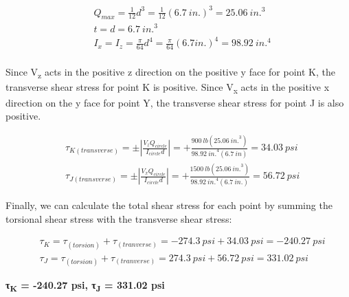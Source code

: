 \documentclass[
  letterpaper,
  DIV=11,
  numbers=noendperiod]{scrreprt}
\theoremstyle{definition}
\theoremstyle{remark}
\begin{document}
\begin{tcolorbox}
\begin{tcolorbox}
\[
\begin{aligned}
& Q_{max}=\frac{1}{12} d^3=\frac{1}{12}(6.7{~in.})^3=25.06{~in.^3} \\
& t=d=6.7{~in.}^3 \\
& I_x=I_z=\frac{\pi}{64} d^4=\frac{\pi}{64}(6.7{in.})^4=98.92{~in.^4} \\
&
\end{aligned}
\]

Since V\textsubscript{z} acts in the positive z direction on the
positive y face for point K, the transverse shear stress for point K is
positive. Since V\textsubscript{x} acts in the positive x direction on
the y face for point Y, the transverse shear stress for point J is also
positive.

\[
\begin{aligned}
& \tau_{K(transverse)}= \pm\left|\frac{V_z Q_{circle}}{I_{circle} d}\right|=+\frac{900{~lb}(25.06{~in.}^3)}{98.92{~in.}^4(6.7 {~in})}=34.03{~psi} \\
& \tau_{J(transverse)}= \pm\left|\frac{V_x Q_{circle}}{I_{circle} d}\right|=+\frac{1500{~lb}(25.06{~in.}^3)}{98.92{~in.}^4(6.7 {~in.})}=56.72{~psi}
\end{aligned}
\]

Finally, we can calculate the total shear stress for each point by
summing the torsional shear stress with the transverse shear stress:

\[
\begin{aligned}
& \tau_K=\tau_{(torsion)}+\tau_{(tranverse)}=-274.3{~psi}+34.03{~psi}=-240.27{~psi} \\
& \tau_J=\tau_{(torsion)}+\tau_{(tranverse)}=274.3{~psi}+56.72{~psi}=331.02{~psi}
\end{aligned}
\]

\textbf{τ\textsubscript{K} = -240.27 psi, τ\textsubscript{J} = 331.02
psi}

\end{tcolorbox}

\end{tcolorbox}
\end{document}

